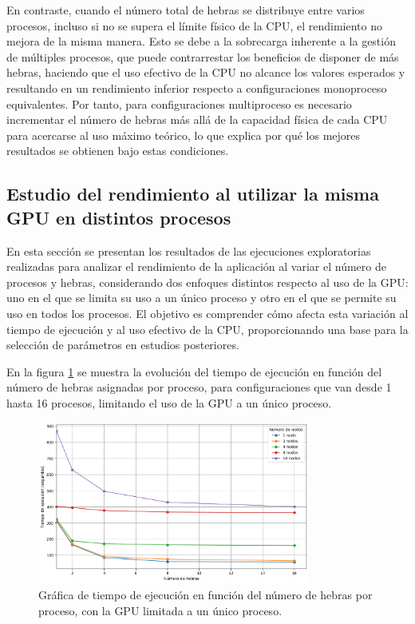 En contraste, cuando el número total de hebras se distribuye entre varios procesos, incluso si no se supera el límite físico de la CPU, el rendimiento no mejora de la misma manera. Esto se debe a la sobrecarga inherente a la gestión de múltiples procesos, que puede contrarrestar los beneficios de disponer de más hebras, haciendo que el uso efectivo de la CPU no alcance los valores esperados y resultando en un rendimiento inferior respecto a configuraciones monoproceso equivalentes. Por tanto, para configuraciones multiproceso es necesario incrementar el número de hebras más allá de la capacidad física de cada CPU para acercarse al uso máximo teórico, lo que explica por qué los mejores resultados se obtienen bajo estas condiciones.

\subsection{Estudio del rendimiento al utilizar la misma GPU en distintos procesos}

En esta sección se presentan los resultados de las ejecuciones exploratorias realizadas para analizar el rendimiento de la aplicación al variar el número de procesos y hebras, considerando dos enfoques distintos respecto al uso de la GPU: uno en el que se limita su uso a un único proceso y otro en el que se permite su uso en todos los procesos. El objetivo es comprender cómo afecta esta variación al tiempo de ejecución y al uso efectivo de la CPU, proporcionando una base para la selección de parámetros en estudios posteriores.

En la figura \ref{fig:exploratory_gpu_limit_time} se muestra la evolución del tiempo de ejecución en función del número de hebras asignadas por proceso, para configuraciones que van desde 1 hasta 16 procesos, limitando el uso de la GPU a un único proceso.

\begin{figure}[ht]
    \centering
    \includegraphics[width=0.8\textwidth]{imagenes/cap5/exploratory_gpu_limit_time.png}
    \caption{Gráfica de tiempo de ejecución en función del número de hebras por proceso, con la GPU limitada a un único proceso.}
    \label{fig:exploratory_gpu_limit_time}
\end{figure}

